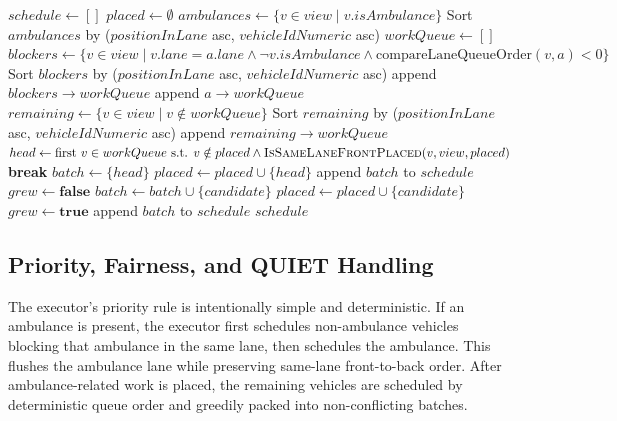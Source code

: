 \documentclass[fleqn,10pt]{olplainarticle}
\begin{document}
\begin{algorithm}[H]
\caption{\textsc{ExecuteIntersectionOrder}$(view)$}
\begin{algorithmic}[1]
\State $schedule \gets []$
\State $placed \gets \emptyset$
\State $ambulances \gets \{ v \in view \mid v.isAmbulance \}$
\State Sort $ambulances$ by ($positionInLane$ asc, $vehicleIdNumeric$ asc)
\State $workQueue \gets []$
    \State $blockers \gets \{ v \in view \mid v.lane = a.lane \land \neg v.isAmbulance \land \text{compareLaneQueueOrder}(v, a) < 0 \}$
    \State Sort $blockers$ by ($positionInLane$ asc, $vehicleIdNumeric$ asc)
    \State append $blockers \to workQueue$
    \State append $a \to workQueue$
\EndFor
\State $remaining \gets \{ v \in view \mid v \notin workQueue \}$
\State Sort $remaining$ by ($positionInLane$ asc, $vehicleIdNumeric$ asc)
\State append $remaining \to workQueue$
    \State $head \gets \text{first } v \in workQueue \text{ s.t. } v \notin placed \land \textsc{IsSameLaneFrontPlaced}(v, view, placed)$
        \State \textbf{break}
    \EndIf
    \State $batch \gets \{ head \}$
    \State $placed \gets placed \cup \{ head \}$
        \State append $batch$ to $schedule$ 
    \Else
        \Repeat
            \State $grew \gets \textbf{false}$
                    \State $batch \gets batch \cup \{ candidate \}$
                    \State $placed \gets placed \cup \{ candidate \}$
                    \State $grew \gets \textbf{true}$
                \EndIf
            \EndFor
        \State append $batch$ to $schedule$
    \EndIf
\EndWhile
\State \Return $schedule$
\end{algorithmic}
\end{algorithm}

\subsection{Priority, Fairness, and QUIET Handling}
\label{subsec:priority-fairness-quiet}

The executor's priority rule is intentionally simple and deterministic. If an ambulance is present, the executor first schedules non-ambulance vehicles blocking that ambulance in the same lane, then schedules the ambulance. This flushes the ambulance lane while preserving same-lane front-to-back order. After ambulance-related work is placed, the remaining vehicles are scheduled by deterministic queue order and greedily packed into non-conflicting batches.
\end{document}
